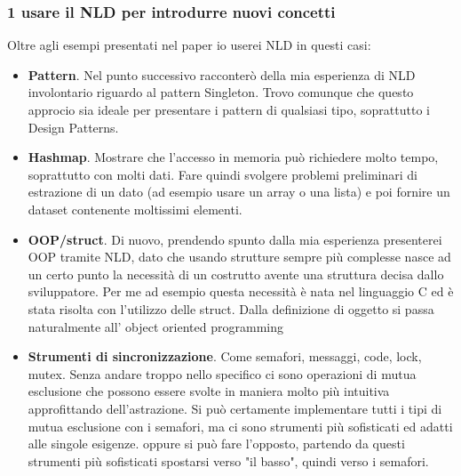 \documentclass[a4paper]{article}
\begin{document}
\subsubsection{1 usare il NLD per introdurre nuovi concetti}
Oltre agli esempi presentati nel paper \cite{NLD} io userei NLD in questi casi:
\begin{itemize}
	\item \textbf{Pattern}. Nel punto successivo racconterò della mia esperienza di NLD involontario riguardo al pattern Singleton. Trovo comunque che questo approcio sia ideale per presentare i pattern di qualsiasi tipo, soprattutto i Design Patterns.
	\item \textbf{Hashmap}. Mostrare che l'accesso in memoria può richiedere molto tempo, soprattutto con molti dati. Fare quindi svolgere problemi preliminari di estrazione di un dato (ad esempio usare un array o una lista) e poi fornire un dataset contenente moltissimi elementi.
	\item \textbf{OOP/struct}. Di nuovo, prendendo spunto dalla mia esperienza presenterei OOP tramite NLD, dato che usando strutture sempre più complesse nasce ad un certo punto la necessità di un costrutto avente una struttura decisa dallo sviluppatore. Per me ad esempio questa necessità è nata nel linguaggio C ed è stata risolta con l'utilizzo delle struct. Dalla definizione di oggetto si passa naturalmente all' object oriented programming
	\item \textbf{Strumenti di sincronizzazione}. Come semafori, messaggi, code, lock, mutex. Senza andare troppo nello specifico ci sono operazioni di mutua esclusione che possono essere svolte in maniera molto più intuitiva approfittando dell'astrazione. Si può certamente implementare tutti i tipi di mutua esclusione con i semafori, ma ci sono strumenti più sofisticati ed adatti alle singole esigenze. oppure si può fare l'opposto, partendo da questi strumenti più sofisticati spostarsi verso "il basso", quindi verso i semafori.
\end{itemize}
\end{document}
